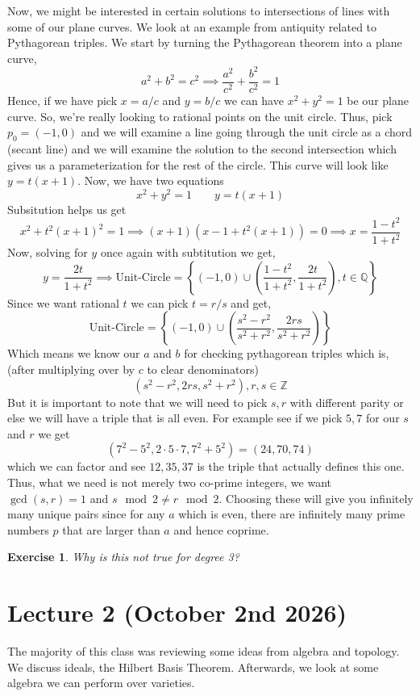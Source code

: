 \documentclass[11pt,a4paper]{article}
\theoremstyle{plain}
\newtheorem{exercise}[theorem]{Exercise}
\theoremstyle{definition}
\theoremstyle{remark}
\begin{document}
\noindent
Now, we might be interested in certain solutions to intersections of lines with some of our plane curves. We look at an example from antiquity related to Pythagorean triples. We start by turning the Pythagorean theorem into a plane curve, $$a^2 +b^2 = c^2 \implies \frac{a^2}{c^2} + \frac{b^2}{c^2} = 1$$ Hence, if we have pick $x = a/c$ and $y = b/c$ we can have $x^2+y^2=1$ be our plane curve. So, we're really looking to rational points on the unit circle. Thus, pick $p_0 = (-1,0)$ and we will examine a line going through the unit circle as a chord (secant line) and we will examine the solution to the second intersection which gives us a parameterization for the rest of the circle. This curve will look like $y=t(x+1)$. Now, we have two equations $$x^2+y^2=1 \qquad y=t(x+1)$$ Subsitution helps us get $$x^2+t^2(x+1)^2=1 \implies (x+1)(x-1+t^2(x+1))=0 \implies x = \frac{1-t^2}{1+t^2}$$ Now, solving for $y$ once again with subtitution we get, $$y = \frac{2t}{1+t^2} \implies \text{Unit-Circle} = \left\{(-1,0) \cup \left(\frac{1-t^2}{1+t^2},\frac{2t}{1+t^2}\right), t \in \mathbb{Q}\right\}$$ Since we want rational $t$ we can pick $t= r/s$ and get, $$\text{Unit-Circle} = \left\{(-1,0) \cup \left(\frac{s^2-r^2}{s^2+r^2},\frac{2rs}{s^2+r^2}\right)\right\}$$ Which means we know our $a$ and $b$ for checking pythagorean triples which is, (after multiplying over by $c$ to clear denominators) $$(s^2-r^2, 2rs, s^2+r^2), r,s \in \mathbb{Z}$$ But it is important to note that we will need to pick $s, r$ with different parity or else we will have a triple that is all even. For example see if we pick $5, 7$ for our $s$ and $r$ we get $$(7^2-5^2, 2\cdot 5 \cdot 7, 7^2+5^2) = (24, 70, 74)$$ which we can factor and see $12, 35, 37$ is the triple that actually defines this one. Thus, what we need is not merely two co-prime integers, we want $\gcd(s,r)=1$ and $s \mod 2 \neq r \mod 2$. Choosing these will give you infinitely many unique pairs since for any $a$ which is even, there are infinitely many prime numbers $p$ that are larger than $a$ and hence coprime. 

\begin{exercise}
    Why is this not true for degree 3?
\end{exercise}

\section{Lecture 2 (October 2nd 2026)}

The majority of this class was reviewing some ideas from algebra and topology. We discuss ideals, the Hilbert Basis Theorem. Afterwards, we look at some algebra we can perform over varieties.
\end{document}
